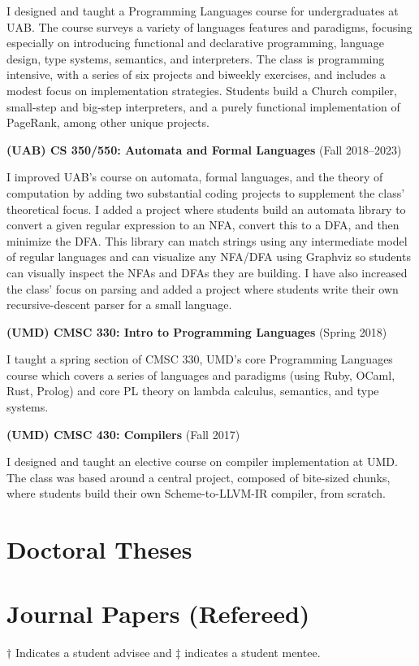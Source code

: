 \documentclass[line]{res}
\begin{document}
\begin{resume}
I designed and taught a Programming Languages course for undergraduates at UAB. The course surveys a variety of languages features and paradigms, focusing especially on introducing functional and declarative programming, language design, type systems, semantics, and interpreters. The class is programming intensive, with a series of six projects and biweekly exercises, and includes a modest focus on implementation strategies. Students build a Church compiler, small-step and big-step interpreters, and a purely functional implementation of PageRank, among other unique projects.

\textbf{(UAB) CS 350/550: Automata and Formal Languages} (Fall 2018--2023)

I improved UAB's course on automata, formal languages, and the theory of computation by adding two substantial coding projects to supplement the class' theoretical focus. I added a project where students build an automata library to convert a given regular expression to an NFA, convert this to a DFA, and then minimize the DFA. This library can match strings using any intermediate model of regular languages and can visualize any NFA/DFA using Graphviz so students can visually inspect the NFAs and DFAs they are building. I have also increased the class' focus on parsing and added a project where students write their own recursive-descent parser for a small language.

\textbf{(UMD) CMSC 330: Intro to Programming Languages} (Spring 2018)

I taught a spring section of CMSC 330, UMD's core Programming Languages course which covers a series of languages and paradigms (using Ruby, OCaml, Rust, Prolog) and core PL theory on lambda calculus, semantics, and type systems. 

\textbf{(UMD) CMSC 430: Compilers} (Fall 2017)

I designed and taught an elective course on compiler implementation at UMD. The class was based around a central project, composed of bite-sized chunks, where students build their own Scheme-to-LLVM-IR compiler, from scratch. 

\section{\large Doctoral Theses} \vspace{0.3cm}

\vspace{-0.4cm}

\section{\large Journal Papers (Refereed)} \vspace{0.3cm}
\indent $\dagger$ Indicates a student advisee and $\ddagger$ indicates a student mentee.


\end{resume}
\end{document}

